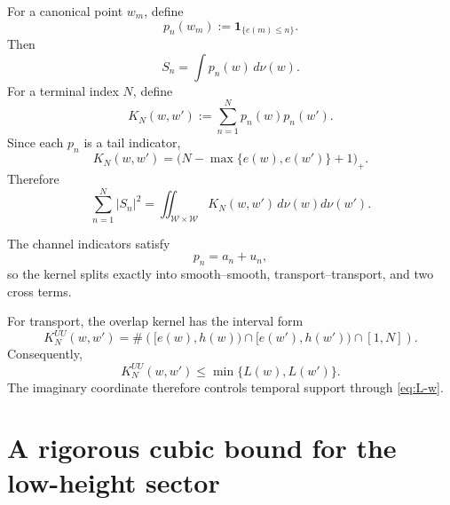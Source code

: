 \documentclass[11pt]{article}
\theoremstyle{definition}
\theoremstyle{remark}
\newcommand{\1}{\mathbf{1}}
\begin{document}
For a canonical point $w_m$, define
\begin{equation}
 p_n(w_m):=\1_{\{e(m)\le n\}}.
 \label{eq:prefix-indicator}
\end{equation}
Then
\begin{equation}
 S_n=\int p_n(w)\,d\nu(w).
 \label{eq:S-integral}
\end{equation}
For a terminal index $N$, define
\begin{equation}
 K_N(w,w')
 :=\sum_{n=1}^{N}p_n(w)p_n(w').
 \label{eq:prefix-kernel}
\end{equation}
Since each $p_n$ is a tail indicator,
\begin{equation}
 K_N(w,w')
 =
 \bigl(N-\max\{e(w),e(w')\}+1\bigr)_+.
 \label{eq:prefix-kernel-explicit}
\end{equation}
Therefore
\begin{equation}
 \boxed{
 \sum_{n=1}^{N}|S_n|^2
 =
 \iint_{\mathscr W\times\mathscr W}
 K_N(w,w')\,d\nu(w)d\nu(w').
 }
 \label{eq:variance-kernel}
\end{equation}

The channel indicators satisfy
\begin{equation}
 p_n=a_n+u_n,
 \label{eq:channel-indicator-sum}
\end{equation}
so the kernel splits exactly into smooth--smooth, transport--transport, and two cross terms.

For transport, the overlap kernel has the interval form
\begin{equation}
 K_N^{UU}(w,w')
 =
 \#\left(
 [e(w),h(w))
 \cap
 [e(w'),h(w'))
 \cap
 [1,N]
 \right).
 \label{eq:transport-overlap}
\end{equation}
Consequently,
\begin{equation}
 K_N^{UU}(w,w')
 \le\min\{L(w),L(w')\}.
 \label{eq:transport-overlap-bound}
\end{equation}
The imaginary coordinate therefore controls temporal support through \cref{eq:L-w}.

\section{A rigorous cubic bound for the low-height sector}
\label{sec:low-cubic}
\end{document}

